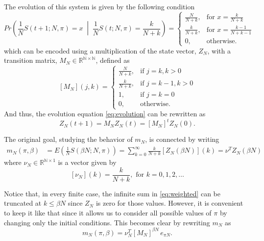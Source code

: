 \documentclass{article}
\newcommand{\N}{\mathbb{N}}
\newcommand{\R}{\mathbb{R}}
\newcommand{\ppar}[1]{\left( #1 \right)}
\newcommand{\spar}[1]{\left[ #1 \right]}
\begin{document}
The evolution of this system is given by the following condition
\begin{equation}
    Pr\ppar{\frac{1}{N} S(t+1; N, \pi) = x \;\middle|\; \frac{1}{N} S(t; N, \pi) = \frac{k}{N+k}} = 
    \begin{cases}
        \frac{N}{N+k}, &\text{for } x= \frac{k}{N+k} \\
        \frac{k}{N+k}, &\text{for } x= \frac{k-1}{N+k-1} \\
        0, &\text{otherwise.}
    \end{cases}
    \label{eq:evolution}
\end{equation}
which can be encoded using a multiplication of the state vector, $Z_N$, with a transition matrix, $M_N\in \R^{\N\times \N}$, defined as
\begin{equation}
    \spar{M_N}(j,k) = 
    \begin{cases}
        \frac{N}{N+k}, &\text{if } j= k, k>0 \\
        \frac{k}{N+k}, &\text{if } j= k-1, k>0 \\
        1, &\text{if } j= k=0 \\
        0, &\text{otherwise.}
    \end{cases}
\end{equation}
And thus, the evolution equation \eqref{eq:evolution} can be rewritten as
\begin{equation}
    Z_N(t+1) = M_N Z_N(t) = \spar{M_N}^t Z_N(0).
\end{equation}

The original goal, studying the behavior of $m_N$, is connected by writing
\begin{align}
    m_N(\pi, \beta) 
    &= 
    E\ppar{\frac{1}{N}S\ppar{\beta N; N, \pi }}
    =
    \sum_{k=0}^{\infty} \frac{k}{N+k} \spar{Z_N(\beta N)}(k)
    =
    \nu^T Z_N(\beta N)
    \label{eq:weighted}
\end{align}
where $\nu_N \in \R^{\N \times 1}$ is a vector given by
\begin{equation}
    \spar{\nu_N}(k) = \frac{k}{N+k}, \text{ for } k=0,1, 2, \dots
\end{equation}

Notice that, in every finite case, the infinite sum in \eqref{eq:weighted} can be truncated at $k\leq \beta N$ since $Z_N$ is zero for those values.
%
However, it is convenient to keep it like that since it allows us to consider all possible values of $\pi$ by changing only the initial conditions.
%
This becomes clear by rewriting $m_N$ as
\begin{equation}
    m_N(\pi, \beta) = \nu_N^T \spar{M_N}^{\beta N}\, e_{\pi N}.
    \label{eq:mat_mult_base}
\end{equation}
\end{document}
